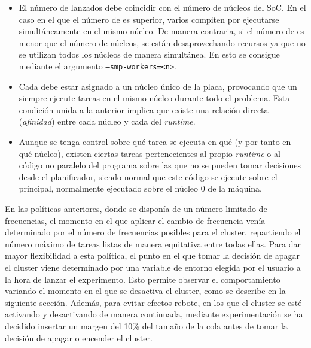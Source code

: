 \begin{itemize}
\item El número de \wts lanzados debe coincidir con el número de núcleos
  del SoC. En el caso en el que el número de \wts es superior, varios \wts
  compiten por ejecutarse simultáneamente en el mismo núcleo. De manera
  contraria, si el número de \wts es menor que el número de núcleos, se
  están desaprovechando recursos ya que no se utilizan todos los núcleos de
  manera simultánea. En \nanos esto se consigue mediante el argumento
  \texttt{--smp-workers=<n>}.
\item Cada \wt debe estar asignado a un núcleo único de la placa,
  provocando que un \wt siempre ejecute tareas en el mismo núcleo durante
  todo el problema. Esta condición unida a la anterior implica que existe
  una relación directa ({\em afinidad}) entre cada núcleo y cada \wt del
  \emph{runtime}.
\item Aunque se tenga control sobre qué tarea se ejecuta en qué \wt (y por
  tanto en qué núcleo), existen ciertas tareas pertenecientes al propio
  \emph{runtime} o al código no paralelo del programa sobre las que no se
  pueden tomar decisiones desde el planificador, siendo normal que este
  código se ejecute sobre el \wt principal, normalmente ejecutado sobre el
  núcleo 0 de la máquina.
\end{itemize}


En las políticas anteriores, donde se disponía de un número limitado de
frecuencias, el momento en el que aplicar el cambio de frecuencia venía
determinado por el número de frecuencias posibles para el cluster,
repartiendo el número máximo de tareas listas de manera equitativa entre
todas ellas. Para dar mayor flexibilidad a esta política, el punto en el
que tomar la decisión de apagar el cluster viene determinado por una
variable de entorno elegida por el usuario a la hora de lanzar el
experimento. Esto permite observar el comportamiento variando el momento en
el que se desactiva el cluster, como se describe en la siguiente
sección. Además, para evitar efectos rebote, en los que el cluster se esté
activando y desactivando de manera continuada, mediante experimentación se
ha decidido insertar un margen del 10\% del tamaño de la cola antes de
tomar la decisión de apagar o encender el cluster.

